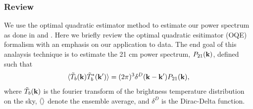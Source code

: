 \documentclass[twocolumn,numberedappendix]{emulateapj} \shorttitle{PSA64}
\begin{document}
%
%
\subsubsection{Review}
We use the optimal quadratic estimator method to estimate our power spectrum as
done in \cite{dillon_et_al2013a} and \cite{liu_tegmark2011}.  Here we briefly review the
optimal quadratic esitimator (OQE) formalism with an emphasis on our application
to data. The end goal of this analaysis technique is to estimate the 21 cm
power spectrum, $P_{21}(\mathbf{k})$, defined such that 
\begin{equation}
\label{eqn:pspec_def}
    \expval{\tilde{T}_{b}(\k)\tilde{T}^{*}_{b}(\k^{\prime})} =
            (2\pi)^{3}\delta^{D}(\k - \k^{\prime})P_{21}(\k),
\end{equation}
where $\tilde{T}_{b}(\mathbf{k})$ is the fourier transform of the brightness temperature
distribution on the sky, $\langle  \rangle$ denote the ensemble average, and
$\delta^{D}$ is the Dirac-Delta function. 
\end{document}
